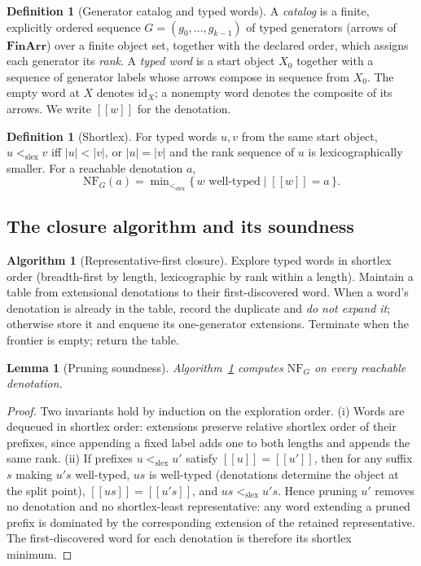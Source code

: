 \documentclass[11pt]{amsart}
\newtheorem{lemma}[theorem]{Lemma}
\theoremstyle{definition}
\newtheorem{definition}[theorem]{Definition}
\newtheorem{algorithm}[theorem]{Algorithm}
\theoremstyle{remark}
\providecommand{\llbracket}{[\![}
\providecommand{\rrbracket}{]\!]}
\newcommand{\NF}{\mathrm{NF}}
\newcommand{\id}{\mathrm{id}}
\newcommand{\FinArr}{\mathbf{FinArr}}
\begin{document}
\begin{definition}[Generator catalog and typed words]\label{def:catalog}
A \emph{catalog} is a finite, explicitly ordered sequence $G=(g_0,\dots,g_{k-1})$ of typed generators (arrows of $\FinArr$) over a finite object set, together with the declared order, which assigns each generator its \emph{rank}. A \emph{typed word} is a start object $X_0$ together with a sequence of generator labels whose arrows compose in sequence from $X_0$. The empty word at $X$ denotes $\id_X$; a nonempty word denotes the composite of its arrows. We write $\llbracket w\rrbracket$ for the denotation.
\end{definition}

\begin{definition}[Shortlex]\label{def:shortlex}
For typed words $u,v$ from the same start object, $u<_{\mathrm{slex}}v$ iff $|u|<|v|$, or $|u|=|v|$ and the rank sequence of $u$ is lexicographically smaller. For a reachable denotation $a$,
\[
\NF_G(a)=\min\nolimits_{<_{\mathrm{slex}}}\{\,w \text{ well-typed} \mid \llbracket w\rrbracket=a\,\}.
\]
\end{definition}

\subsection{The closure algorithm and its soundness}

\begin{algorithm}[Representative-first closure]\label{alg:closure}
Explore typed words in shortlex order (breadth-first by length, lexicographic by rank within a length). Maintain a table from extensional denotations to their first-discovered word. When a word's denotation is already in the table, record the duplicate and \emph{do not expand it}; otherwise store it and enqueue its one-generator extensions. Terminate when the frontier is empty; return the table.
\end{algorithm}

\begin{lemma}[Pruning soundness]\label{lem:pruning}
Algorithm~\textup{\ref{alg:closure}} computes $\NF_G$ on every reachable denotation.
\end{lemma}

\begin{proof}
Two invariants hold by induction on the exploration order. (i) Words are dequeued in shortlex order: extensions preserve relative shortlex order of their prefixes, since appending a fixed label adds one to both lengths and appends the same rank. (ii) If prefixes $u<_{\mathrm{slex}}u'$ satisfy $\llbracket u\rrbracket=\llbracket u'\rrbracket$, then for any suffix $s$ making $u's$ well-typed, $us$ is well-typed (denotations determine the object at the split point), $\llbracket us\rrbracket=\llbracket u's\rrbracket$, and $us<_{\mathrm{slex}}u's$. Hence pruning $u'$ removes no denotation and no shortlex-least representative: any word extending a pruned prefix is dominated by the corresponding extension of the retained representative. The first-discovered word for each denotation is therefore its shortlex minimum.
\end{proof}
\end{document}
